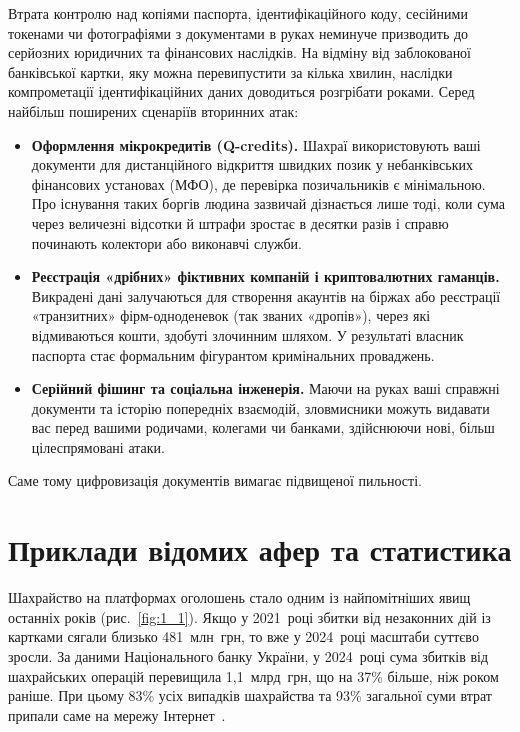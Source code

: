 Втрата контролю над копіями паспорта, ідентифікаційного коду, сесійними токенами чи фотографіями з документами в руках неминуче призводить до серйозних юридичних та фінансових наслідків. На відміну від заблокованої банківської картки, яку можна перевипустити за кілька хвилин, наслідки компрометації ідентифікаційних даних доводиться розгрібати роками. Серед найбільш поширених сценаріїв вторинних атак:
\begin{itemize}
    \item \textbf{Оформлення мікрокредитів (Q-credits).} Шахраї використовують ваші документи для дистанційного відкриття швидких позик у небанківських фінансових установах (МФО), де перевірка позичальників є мінімальною. Про існування таких боргів людина зазвичай дізнається лише тоді, коли сума через величезні відсотки й штрафи зростає в десятки разів і справю починають колектори або виконавчі служби.
    \item \textbf{Реєстрація «дрібних» фіктивних компаній і криптовалютних гаманців.} Викрадені дані залучаються для створення акаунтів на біржах або реєстрації «транзитних» фірм-одноденевок (так званих «дропів»), через які відмиваються кошти, здобуті злочинним шляхом. У результаті власник паспорта стає формальним фігурантом кримінальних проваджень.
    \item \textbf{Серійний фішинг та соціальна інженерія.} Маючи на руках ваші справжні документи та історію попередніх взаємодій, зловмисники можуть видавати вас перед вашими родичами, колегами чи банками, здійснюючи нові, більш цілеспрямовані атаки.
\end{itemize}

Саме тому цифровизація документів вимагає підвищеної пильності.

\newpage

\chapter{Приклади відомих афер та статистика}

Шахрайство на платформах оголошень стало одним із найпомітніших явищ останніх років (рис.~\ref{fig:1_1}). Якщо у 2021~році збитки від незаконних дій із картками сягали близько 481~млн~грн, то вже у 2024~році масштаби суттєво зросли. За даними Національного банку України, у 2024~році сума збитків від шахрайських операцій перевищила 1,1~млрд~грн, що на 37\% більше, ніж роком раніше. При цьому 83\% усіх випадків шахрайства та 93\% загальної суми втрат припали саме на мережу Інтернет~\cite{NBU2025}.

